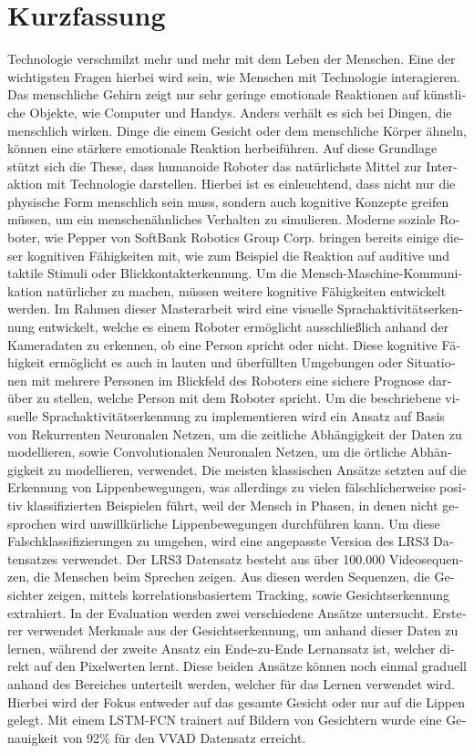 \chapter{Kurzfassung}
\begin{german}
Technologie verschmilzt mehr und mehr mit dem Leben der Menschen. 
Eine der wichtigsten Fragen hierbei wird sein, wie Menschen mit Technologie interagieren.
Das menschliche Gehirn zeigt nur sehr geringe emotionale Reaktionen auf künstliche Objekte, wie Computer und Handys.
Anders verhält es sich bei Dingen, die menschlich wirken. Dinge die einem Gesicht oder dem menschliche Körper ähneln, können eine stärkere emotionale Reaktion herbeiführen.
Auf diese Grundlage stützt sich die These, dass humanoide Roboter das natürlichste Mittel zur Interaktion mit Technologie darstellen.
Hierbei ist es einleuchtend, dass nicht nur die physische Form menschlich sein muss, sondern auch kognitive Konzepte greifen müssen, um ein menschenähnliches Verhalten zu simulieren.
Moderne soziale Roboter, wie Pepper von SoftBank Robotics Group Corp. bringen bereits einige dieser kognitiven Fähigkeiten mit, wie zum Beispiel die Reaktion auf auditive und taktile Stimuli oder Blickkontakterkennung.
Um die Mensch-Maschine-Kommunikation natürlicher zu machen, müssen weitere kognitive Fähigkeiten entwickelt werden.
Im Rahmen dieser Masterarbeit wird eine visuelle Sprachaktivitätserkennung entwickelt, welche es einem Roboter ermöglicht ausschließlich anhand der Kameradaten zu erkennen, ob eine Person spricht oder nicht.
Diese kognitive Fähigkeit ermöglicht es auch in lauten und überfüllten Umgebungen oder Situationen mit mehrere Personen im Blickfeld des Roboters eine sichere Prognose darüber zu stellen, welche Person mit dem Roboter spricht.
Um die beschriebene visuelle Sprachaktivitätserkennung zu implementieren wird ein Ansatz auf Basis von Rekurrenten Neuronalen Netzen, um die zeitliche Abhängigkeit der Daten zu modellieren, sowie Convolutionalen Neuronalen Netzen, um die örtliche Abhängigkeit zu modellieren, verwendet.
Die meisten klassischen Ansätze setzten auf die Erkennung von Lippenbewegungen, was allerdings zu vielen fälschlicherweise positiv klassifizierten Beispielen führt, weil der Mensch in Phasen, in denen nicht gesprochen wird unwillkürliche Lippenbewegungen durchführen kann.
Um diese Falschklassifizierungen zu umgehen, wird eine angepasste Version des LRS3 Datensatzes verwendet.
Der LRS3 Datensatz besteht aus über 100.000 Videosequenzen, die Menschen beim Sprechen zeigen.
Aus diesen werden Sequenzen, die Gesichter zeigen, mittels korrelationsbasiertem Tracking, sowie Gesichtserkennung extrahiert.
In der Evaluation werden zwei verschiedene Ansätze untersucht.
Ersterer verwendet Merkmale aus der Gesichtserkennung, um anhand dieser Daten zu lernen, während der zweite Ansatz ein Ende-zu-Ende Lernansatz ist, welcher direkt auf den Pixelwerten lernt.
Diese beiden Ansätze können noch einmal graduell anhand des Bereiches unterteilt werden, welcher für das Lernen verwendet wird.
Hierbei wird der Fokus entweder auf das gesamte Gesicht oder nur auf  die Lippen gelegt.  
Mit einem LSTM-FCN trainert auf Bildern von Gesichtern wurde eine Genauigkeit von 92\% für den VVAD Datensatz erreicht.
\end{german}
